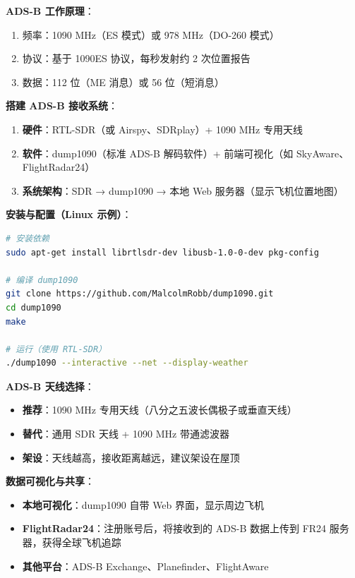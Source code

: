 \documentclass[12pt,UTF8]{ctexbook}
\begin{document}
\textbf{ADS-B 工作原理}：
\begin{enumerate}[leftmargin=2cm]
    \item 频率：1090 MHz（ES 模式）或 978 MHz（DO-260 模式）
    \item 协议：基于 1090ES 协议，每秒发射约 2 次位置报告
    \item 数据：112 位（ME 消息）或 56 位（短消息）
\end{enumerate}

\textbf{搭建 ADS-B 接收系统}：
\begin{enumerate}[leftmargin=2cm]
    \item \textbf{硬件}：RTL-SDR（或 Airspy、SDRplay）+ 1090 MHz 专用天线
    \item \textbf{软件}：dump1090（标准 ADS-B 解码软件）+ 前端可视化（如 SkyAware、FlightRadar24）
    \item \textbf{系统架构}：SDR → dump1090 → 本地 Web 服务器（显示飞机位置地图）
\end{enumerate}

\textbf{安装与配置（Linux 示例）}：
\begin{lstlisting}[language=Bash,caption={安装 dump1090}]
# 安装依赖
sudo apt-get install librtlsdr-dev libusb-1.0-0-dev pkg-config

# 编译 dump1090
git clone https://github.com/MalcolmRobb/dump1090.git
cd dump1090
make

# 运行（使用 RTL-SDR）
./dump1090 --interactive --net --display-weather
\end{lstlisting}

\textbf{ADS-B 天线选择}：
\begin{itemize}[leftmargin=2cm]
    \item \textbf{推荐}：1090 MHz 专用天线（八分之五波长偶极子或垂直天线）
    \item \textbf{替代}：通用 SDR 天线 + 1090 MHz 带通滤波器
    \item \textbf{架设}：天线越高，接收距离越远，建议架设在屋顶
\end{itemize}

\textbf{数据可视化与共享}：
\begin{itemize}[leftmargin=2cm]
    \item \textbf{本地可视化}：dump1090 自带 Web 界面，显示周边飞机
    \item \textbf{FlightRadar24}：注册账号后，将接收到的 ADS-B 数据上传到 FR24 服务器，获得全球飞机追踪
    \item \textbf{其他平台}：ADS-B Exchange、Planefinder、FlightAware
\end{itemize}
\end{document}
